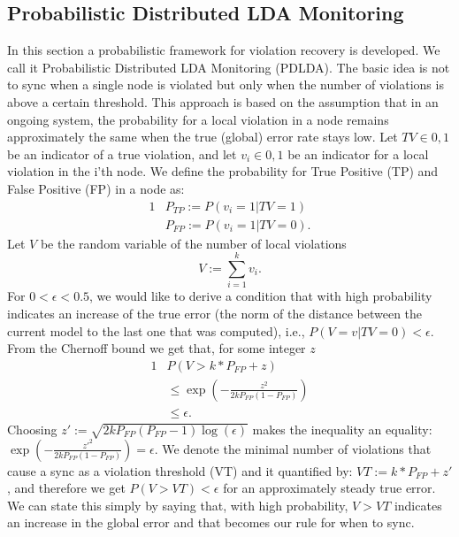 \documentclass[11pt,twocolumn,varwidth=true,a4paper,fleqn]{article}
\begin{document}
\subsection{Probabilistic Distributed LDA Monitoring}
In this section a probabilistic framework for violation recovery is developed.
We call it Probabilistic Distributed LDA Monitoring (PDLDA). The basic idea is
not to sync when a single node is violated but only when the number of
violations is above a certain threshold. 
This approach is based on the assumption that in an ongoing system, 
the probability for a local violation in a node remains approximately the same
when the true (global) error rate stays low. 
Let $TV \in {0,1}$ be an indicator of a true violation,
and let $v_i \in {0,1}$ be an indicator for a local violation in the
i'th node. We define the probability for True Positive (TP) and False Positive
(FP) in a node as:
\begin{alignat*}{1}
& P_{TP} := P(v_i=1 | TV=1) \\
& P_{FP} := P(v_i=1 | TV=0).
\end{alignat*}
Let $V$ be the random variable of the number of local violations
\begin{equation*}
V := \sum_{i=1}^k v_i.
\end{equation*}
For $0 < \epsilon < 0.5$, we would like to derive a condition that 
with high probability indicates an increase of the true error (the norm of
the distance between the current model to the last one that was computed),
i.e., $P(V=v|TV=0) < \epsilon$.
From the Chernoff bound we get that, for some integer $z$
\begin{alignat*}{1}
& P(V>k*P_{FP}+z) \\
& \leq \exp(-\frac{z^2}{2kP_{FP}(1-P_{FP})}) \\
& \leq \epsilon.
\end{alignat*}
Choosing $z':=\sqrt{2kP_{FP}(P_{FP}-1)\log(\epsilon)}$ makes the inequality an
equality: $\exp(-\frac{z'^2}{2kP_{FP}(1-P_{FP})}) = \epsilon$. We denote
the minimal number of violations that cause a sync as a violation threshold
(VT) and it quantified by: $VT:=k*P_{FP}+z'$, and therefore we get $P(V > VT) <
\epsilon$ for an approximately steady true error.
We can state this simply by saying that, with high probability, $V > VT$
indicates an increase in the global error and that becomes our rule for when to
sync.
\end{document}
